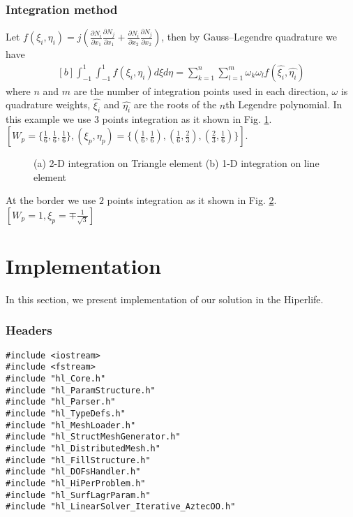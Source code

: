 \documentclass[]{article}
\begin{document}
\subsubsection{Integration method} \label{sec: int}
Let $f(\xi_{i},\eta_{i})=j(\frac{\partial N_{i}}{\partial x_{1}}
\frac{\partial N_{j}}{\partial x_{1}}+\frac{\partial N_{i}}{\partial x_{2}} 
\frac{\partial N_{j}}{\partial x_{2}})$, then by Gauss–Legendre quadrature we have
\begin{equation}\label{eq20}
	\begin{aligned}[b]
		\int_{-1}^1 \int_{-1}^1 f(\xi_{i},\eta_{i}) d\xi d\eta = \sum_{k=1}^{n}\sum_{l=1}^{m} \omega_{k}\omega_{l}f(\hat{\xi_{i}},\hat{\eta_{i}})
	\end{aligned}
\end{equation}
where $n$ and $m$ are the number of integration points used in each direction, $\omega$ is quadrature weights, $\hat{\xi_{i}}$ and $\hat{\eta_{i}}$ are the roots of the $n$th Legendre polynomial. In this example we use $3$ points integration as it shown in Fig. \ref{fig:ifig1}. $[W_{p}=\{\frac{1}{6}, \frac{1}{6},\frac{1}{6} \}, (\xi_{p}, \eta_{p})=\{(\frac{1}{6},\frac{1}{6}), (\frac{1}{6},\frac{2}{3}),  (\frac{2}{3},\frac{1}{6})\}]$.
\begin{figure}
	\begin{subfigure}{.5\textwidth}
		\centering
		
		\caption{}
		\label{fig:ifig1}
	\end{subfigure}%
	\begin{subfigure}{.5\textwidth}
		\centering
		
		\caption{}
		\label{fig:ifig2}
	\end{subfigure}
	\caption{(a) 2-D integration on Triangle element (b) 1-D integration on line element}
	\label{fig:int}
\end{figure}
At the border we use $2$ points integration as it shown in Fig. \ref{fig:ifig2}. $[W_{p}=1, \xi_{p}=\mp \frac{1}{\sqrt{3}}]$

\section{Implementation} \label{sec: imp}
In this section, we present implementation of our solution in the Hiperlife.
\subsubsection{Headers} \label{sec: hdr}
\begin{lstlisting}
#include <iostream>
#include <fstream>
#include "hl_Core.h"
#include "hl_ParamStructure.h"
#include "hl_Parser.h"
#include "hl_TypeDefs.h"
#include "hl_MeshLoader.h"
#include "hl_StructMeshGenerator.h"
#include "hl_DistributedMesh.h"
#include "hl_FillStructure.h"
#include "hl_DOFsHandler.h"
#include "hl_HiPerProblem.h"
#include "hl_SurfLagrParam.h"
#include "hl_LinearSolver_Iterative_AztecOO.h"
\end{lstlisting}
\end{document}

